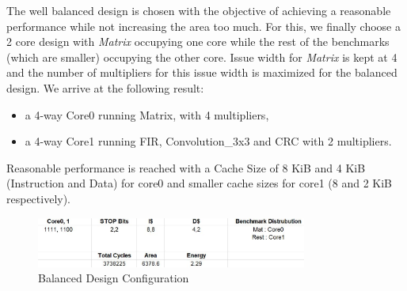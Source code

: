 \documentclass[conference]{IEEEtran}
\begin{document}
The well balanced design is chosen with the objective of achieving a reasonable performance while not increasing the area too much.
For this, we finally choose a 2 core design with \textit{Matrix} occupying one core while the rest of the benchmarks (which are smaller) occupying the other core. Issue width for \textit{Matrix} is kept at 4 and the number of multipliers for this issue width is maximized for the balanced design.
We arrive at the following result:
\begin{itemize}
    \item a 4-way Core0 running Matrix, with 4 multipliers,
    \item a 4-way Core1 running FIR, Convolution\_3x3 and CRC with 2 multipliers.
\end{itemize}
Reasonable performance is reached with a Cache Size of 8 KiB and 4 KiB (Instruction and Data) for core0 and smaller cache sizes for core1 (8 and 2 KiB respectively).

\begin{figure}[h!]
\centering
\includegraphics[width=3.5in]{Balanced.JPG}
\caption{\label{fig:data} Balanced Design Configuration }
\end{figure}

\end{document}

